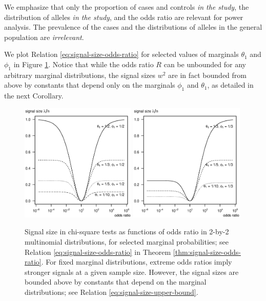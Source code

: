 We emphasize that only the proportion of cases and controls \emph{in the study}, the distribution of alleles \emph{in the study}, and the odds ratio are relevant for power analysis.
The prevalence of the cases and the distributions of alleles in the general population are \emph{irrelevant}.

We plot Relation \eqref{eq:signal-size-odds-ratio} for selected values of marginals $\theta_1$ and $\phi_1$ in Figure \ref{fig:signal-vs-odds}.
Notice that while the odds ratio $R$ can be unbounded for any arbitrary marginal distributions, the signal sizes $w^2$ are in fact bounded from above by constants that depend only on the marginals $\phi_1$ and $\theta_1$, as detailed in the next Corollary.

\begin{figure}
      \centering
      \includegraphics[width=0.49\textwidth]{./singal-vs-odds-p05}
      \includegraphics[width=0.49\textwidth]{./singal-vs-odds-p0333}            
      \caption{Signal size in chi-square tests as functions of odds ratio in 2-by-2 multinomial distributions, for selected marginal probabilities; see Relation \eqref{eq:signal-size-odds-ratio} in Theorem \ref{thm:signal-size-odds-ratio}.
      For fixed marginal distributions, extreme odds ratios imply stronger signals at a given sample size.
      However, the signal sizes are bounded above by constants that depend on the marginal distributions; see Relation \eqref{eq:signal-size-upper-bound}.
      } 
      \label{fig:signal-vs-odds}
\end{figure}

